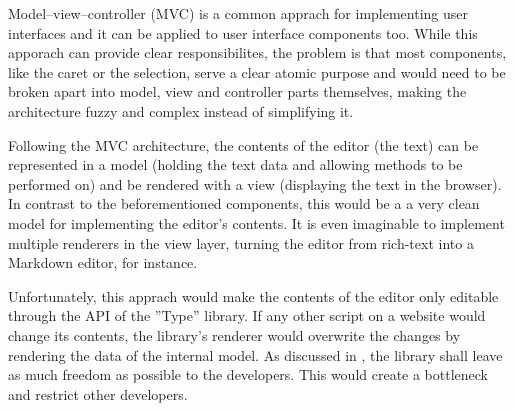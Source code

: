 Model--view--controller (MVC) is a common apprach for implementing user interfaces and it can be applied to user interface components too. While this apporach can provide clear responsibilites, the problem is that most components, like the caret or the selection, serve a clear atomic purpose and would need to be broken apart into model, view and controller parts themselves, making the architecture fuzzy and complex instead of simplifying it.

Following the MVC architecture, the contents of the editor (the text) can be represented in a model (holding the text data and allowing methods to be performed on) and be rendered with a view (displaying the text in the browser). In contrast to the beforementioned components, this would be a a very clean model for implementing the editor's contents. It is even imaginable to implement multiple renderers in the view layer, turning the editor from rich-text into a Markdown editor, for instance.

Unfortunately, this apprach would make the contents of the editor only editable through the API of the ''Type'' library. If any other script on a website would change its contents, the library's renderer would overwrite the changes by rendering the data of the internal model. As discussed in , the library shall leave as much freedom as possible to the developers. This would create a bottleneck and restrict other developers.






